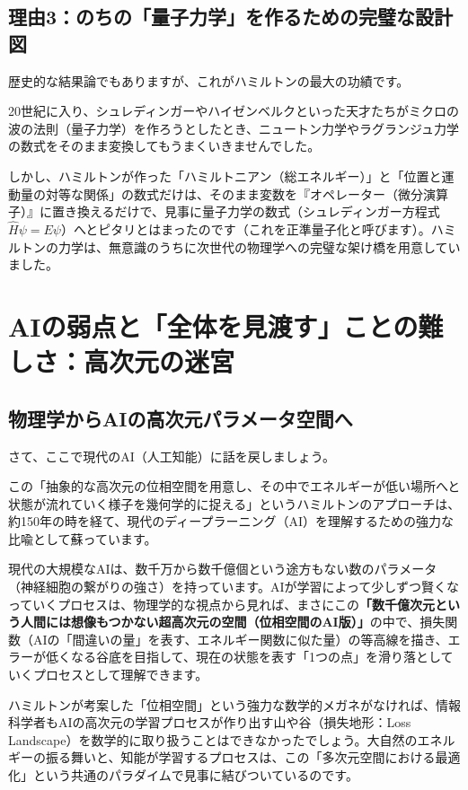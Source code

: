 \subsection{理由3：のちの「量子力学」を作るための完璧な設計図}

歴史的な結果論でもありますが、これがハミルトンの最大の功績です。

20世紀に入り、シュレディンガーやハイゼンベルクといった天才たちがミクロの波の法則（量子力学）を作ろうとしたとき、ニュートン力学やラグランジュ力学の数式をそのまま変換してもうまくいきませんでした。

しかし、ハミルトンが作った「ハミルトニアン（総エネルギー）」と「位置と運動量の対等な関係」の数式だけは、そのまま変数を『オペレーター（微分演算子）』に置き換えるだけで、見事に量子力学の数式（シュレディンガー方程式\(\hat{H}\psi=E\psi\)）へとピタリとはまったのです（これを正準量子化と呼びます）。ハミルトンの力学は、無意識のうちに次世代の物理学への完璧な架け橋を用意していました。

\section{AIの弱点と「全体を見渡す」ことの難しさ：高次元の迷宮}

\subsection{物理学からAIの高次元パラメータ空間へ}

さて、ここで現代のAI（人工知能）に話を戻しましょう。

この「抽象的な高次元の位相空間を用意し、その中でエネルギーが低い場所へと状態が流れていく様子を幾何学的に捉える」というハミルトンのアプローチは、約150年の時を経て、現代のディープラーニング（AI）を理解するための強力な比喩として蘇っています。

現代の大規模なAIは、数千万から数千億個という途方もない数のパラメータ（神経細胞の繋がりの強さ）を持っています。AIが学習によって少しずつ賢くなっていくプロセスは、物理学的な視点から見れば、まさにこの\textbf{「数千億次元という人間には想像もつかない超高次元の空間（位相空間のAI版）」}の中で、損失関数（AIの「間違いの量」を表す、エネルギー関数に似た量）の等高線を描き、エラーが低くなる谷底を目指して、現在の状態を表す「1つの点」を滑り落としていくプロセスとして理解できます。

ハミルトンが考案した「位相空間」という強力な数学的メガネがなければ、情報科学者もAIの高次元の学習プロセスが作り出す山や谷（損失地形：Loss Landscape）を数学的に取り扱うことはできなかったでしょう。大自然のエネルギーの振る舞いと、知能が学習するプロセスは、この「多次元空間における最適化」という共通のパラダイムで見事に結びついているのです。

